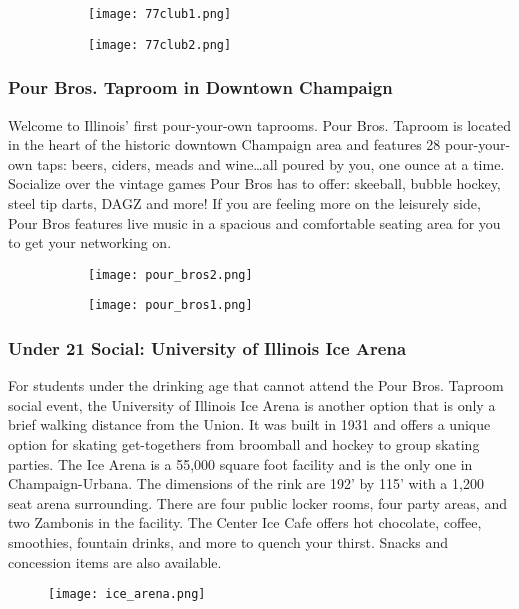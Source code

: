 \begin{figure}[H]
	\centering
	\begin{subfigure}{0.5\textwidth}
		\centering
		\texttt{[image: 77club1.png]}
	\end{subfigure}%
	\begin{subfigure}{0.5\textwidth}
		\centering
		\texttt{[image: 77club2.png]}
	\end{subfigure}		
\end{figure} 

\subsubsection{Pour Bros. Taproom in Downtown Champaign}
Welcome to Illinois' first pour-your-own taprooms. Pour Bros. Taproom is located in the heart of the historic downtown Champaign area and features 28 pour-your-own taps: beers, ciders, meads and wine\ldots all poured by you, one ounce at a time. Socialize over the vintage games Pour Bros has to offer: skeeball, bubble hockey, steel tip darts, DAGZ and more! If you are feeling more on the leisurely side, Pour Bros features live music in a spacious and comfortable seating area for you to get your networking on.

\begin{figure}[H]
	\centering
	\begin{subfigure}{0.5\textwidth}
		\centering
		\texttt{[image: pour\_bros2.png]}
	\end{subfigure}%
	\begin{subfigure}{0.5\textwidth}
		\centering
		\texttt{[image: pour\_bros1.png]}
	\end{subfigure}		
\end{figure} 

\subsubsection{Under 21 Social: University of Illinois Ice Arena}
For students under the drinking age that cannot attend the Pour Bros. Taproom social event, the University of Illinois Ice Arena is another option that is only a brief walking distance from the Union. It was built in 1931 and offers a unique option for skating get-togethers from broomball and hockey to group skating parties. The Ice Arena is a 55,000 square foot facility and is the only one in Champaign-Urbana. The dimensions of the rink are 192' by 115' with a 1,200 seat arena surrounding. There are four public locker rooms, four party areas, and two Zambonis in the facility. The Center Ice Cafe offers hot chocolate, coffee, smoothies, fountain drinks, and more to quench your thirst.  Snacks and concession items are also available.

\begin{figure}[H]
	\centering
	\texttt{[image: ice\_arena.png]}
\end{figure}

